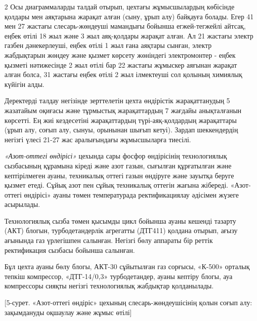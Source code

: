\begin{multicols}{2}
Осы диаграммаларды талдай отырып, цехтағы жұмысшылардың көбісінде
қолдары мен аяқтарына жарақат алған (сыну, ұрып алу) байқауға болады.
Егер 41 мен 27 жастағы слесарь-жөндеуші мамандығы бойынша егжей-тегжейлі
айтсақ, еңбек өтілі 18 жыл және 3 жыл аяқ-қолдары жарақат алған. Ал 21
жастағы электр газбен дәнекерлеуші, еңбек өтілі 1 жыл ғана аяқтары
сынған, электр жабдықтарын жөндеу және қызмет көрсету жөніндегі
электромонтер - еңбек қызметі нәтижесінде 2 жыл өтілі бар 22 жастағы
жұмыскер аяғынан жарақат алған болса, 31 жастағы еңбек өтілі 2 жыл
ілмектеуші сол қолының химиялық күйігін алды.

Деректерді талдау негізінде зерттелетін цехта өндірістік жарақаттанудың
5 жазатайым оқиғасы және тұрмыстық жарақаттардың 7 жағдайы анықталғанын
көрсетті. Ең жиі кездесетіні жарақаттардың түрі-аяқ-қолдардың
жарақаттары (ұрып алу, соғып алу, сынуы, орынынан шығып кетуі). Зардап
шеккендердің негізгі үлесі 21-27 жас аралығындағы жұмысшыларға тиесілі.

\emph{«Азот-оттегі өндірісі»} цехында сары фосфор өндірісінің
технологиялық сызбасының құрамына кіреді және азот газын, сығылған
құрғатылған және кептірілмеген ауаны, техникалық оттегі газын өндіруге
және зауытқа беруге қызмет етеді. Сұйық азот пен сұйық техникалық
оттегін жағына жібереді. «Азот-оттегі өндірісі» ауаны төмен
температурада ректификациялау әдісімен жүзеге асырылады.

Технологиялық сызба төмен қысымды цикл бойынша ауаны кешенді тазарту
(АКТ) блогын, турбодетандерлік агрегатты (ДТГ411) қолдана отырып, ағызу
ағынында газ үрлегішпен салынған. Негізгі бөлу аппараты бір реттік
ректификация сызбасы бойынша салынған.

Бұл цехта ауаны бөлу блогы, АКТ-30 сұйытылған газ сорғысы, «К-500»
орталық тепкіш компрессор, «ДТГ-14/0,3» турбодетандер, ауаны кептіру
блогы, ауа компрессоры сияқты негізгі технологиялық жабдықтар
қолданылады.
\end{multicols}

[5-сурет. «Азот-оттегі өндіріс» цехының
слесарь-жөндеушісінің қолын соғып алу: зақымдануды оқшаулау және жұмыс
өтілі]

